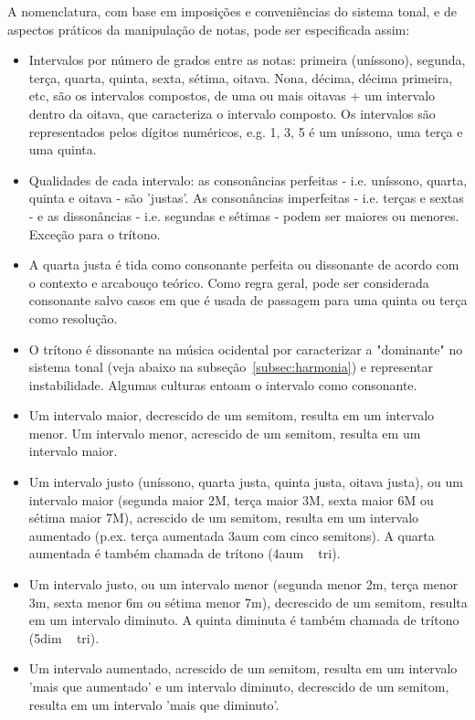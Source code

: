 A nomenclatura, com base em imposições e conveniências do sistema tonal, e de aspectos práticos da manipulação de notas, pode ser especificada assim:\cite{Roederer,Wisnick}
\begin{itemize}
        \item Intervalos por número de grados entre as notas: primeira (uníssono), segunda, terça, quarta, quinta, sexta, sétima, oitava. Nona, décima, décima primeira, etc, são os intervalos compostos, de uma ou mais oitavas + um intervalo dentro da oitava, que caracteriza o intervalo composto. Os intervalos são representados pelos dígitos numéricos, e.g. 1, 3, 5 é um uníssono, uma terça e uma quinta.
        \item Qualidades de cada intervalo: as consonâncias perfeitas - i.e. uníssono, quarta, quinta e oitava - são 'justas'. As consonâncias imperfeitas - i.e. terças e sextas - e as dissonâncias - i.e. segundas e sétimas - podem ser maiores ou menores. Exceção para o trítono.
        \item A quarta justa é tida como consonante perfeita ou dissonante de acordo com o contexto e arcabouço teórico. Como regra geral, pode ser considerada consonante salvo casos em que é usada de passagem para uma quinta ou terça como resolução.
        \item O trítono é dissonante na música ocidental por caracterizar a "dominante" no sistema tonal (veja abaixo na subseção~\ref{subsec:harmonia}) e representar instabilidade. Algumas culturas entoam o intervalo como consonante.
        \item Um intervalo maior, decrescido de um semitom, resulta em um intervalo menor. Um intervalo menor, acrescido de um semitom, resulta em um intervalo maior.
        \item Um intervalo justo (uníssono, quarta justa, quinta justa, oitava justa), ou um intervalo maior (segunda maior 2M, terça maior 3M, sexta maior 6M ou sétima maior 7M), acrescido de um semitom, resulta em um intervalo aumentado (p.ex. terça aumentada 3aum com cinco semitons). A quarta aumentada é também chamada de trítono (4aum ~ tri).
        \item Um intervalo justo, ou um intervalo menor (segunda menor 2m, terça menor 3m, sexta menor 6m ou sétima menor 7m), decrescido de um semitom, resulta em um intervalo diminuto. A quinta diminuta é também chamada de trítono (5dim ~ tri).
        \item Um intervalo aumentado, acrescido de um semitom, resulta em um intervalo 'mais que aumentado' e um intervalo diminuto, decrescido de um semitom, resulta em um intervalo 'mais que diminuto'.

\end{itemize}
